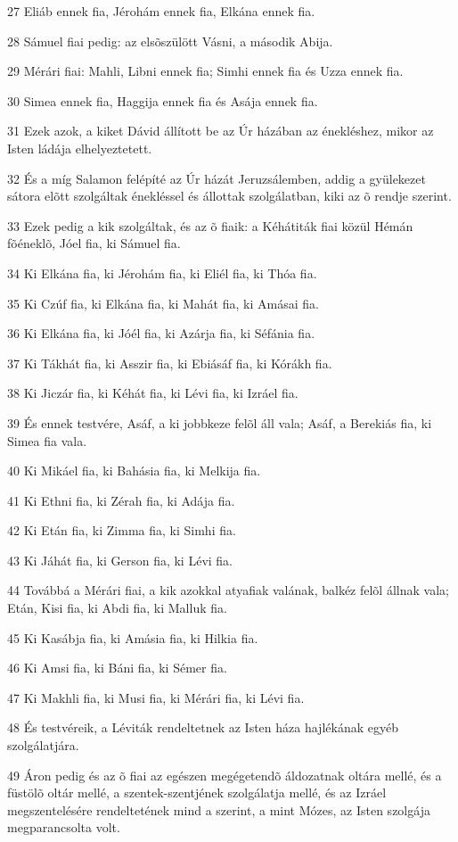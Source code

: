 \par 27 Eliáb ennek fia, Jérohám ennek fia, Elkána ennek fia.
\par 28 Sámuel fiai pedig: az elsõszülött Vásni, a második Abija.
\par 29 Mérári fiai: Mahli, Libni ennek fia; Simhi ennek fia és Uzza ennek fia.
\par 30 Simea ennek fia, Haggija ennek fia és Asája ennek fia.
\par 31 Ezek azok, a kiket Dávid állított be az Úr házában az énekléshez, mikor az Isten ládája elhelyeztetett.
\par 32 És a míg Salamon felépíté az Úr házát Jeruzsálemben, addig a gyülekezet sátora elõtt szolgáltak énekléssel és állottak szolgálatban, kiki az õ rendje szerint.
\par 33 Ezek pedig a kik szolgáltak, és az õ fiaik: a Kéhátiták fiai közül Hémán fõéneklõ, Jóel fia, ki Sámuel fia.
\par 34 Ki Elkána fia, ki Jérohám fia, ki Eliél fia, ki Thóa fia.
\par 35 Ki Czúf fia, ki Elkána fia, ki Mahát fia, ki Amásai fia.
\par 36 Ki Elkána fia, ki Jóél fia, ki Azárja fia, ki Séfánia fia.
\par 37 Ki Tákhát fia, ki Asszir fia, ki Ebiásáf fia, ki Kórákh fia.
\par 38 Ki Jiczár fia, ki Kéhát fia, ki Lévi fia, ki Izráel fia.
\par 39 És ennek testvére, Asáf, a ki jobbkeze felõl áll vala; Asáf, a Berekiás fia, ki Simea fia vala.
\par 40 Ki Mikáel fia, ki Bahásia fia, ki Melkija fia.
\par 41 Ki Ethni fia, ki Zérah fia, ki Adája fia.
\par 42 Ki Etán fia, ki Zimma fia, ki Simhi fia.
\par 43 Ki Jáhát fia, ki Gerson fia, ki Lévi fia.
\par 44 Továbbá a Mérári fiai, a kik azokkal atyafiak valának, balkéz felõl állnak vala; Etán, Kisi fia, ki Abdi fia, ki Malluk fia.
\par 45 Ki Kasábja fia, ki Amásia fia, ki Hilkia fia.
\par 46 Ki Amsi fia, ki Báni fia, ki Sémer fia.
\par 47 Ki Makhli fia, ki Musi fia, ki Mérári fia, ki Lévi fia.
\par 48 És testvéreik, a Léviták rendeltetnek az Isten háza hajlékának egyéb szolgálatjára.
\par 49 Áron pedig és az õ fiai az egészen megégetendõ áldozatnak oltára mellé, és a füstölõ oltár mellé, a szentek-szentjének szolgálatja mellé, és az Izráel megszentelésére rendeltetének mind a szerint, a mint Mózes, az Isten szolgája megparancsolta volt.
